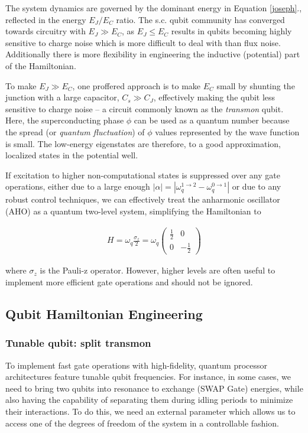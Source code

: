 \documentclass[svgnames]{article}     %
\begin{document}
The system dynamics are governed by the dominant energy in Equation
\ref{joseph}., reflected in the energy $E_J / E_C$ ratio. The s.c. qubit
community has converged towards circuitry with $E_J \gg E_C$, as  $E_J \leq
E_C$ results in qubits becoming highly sensitive to charge noise which is more
difficult to deal with than flux noise. Additionally there is more flexibility
in engineering the inductive (potential) part of the Hamiltonian.

To make $E_J \gg E_C$, one proffered approach is to make $E_C$ small by
shunting the junction with a large capacitor, $C_s \gg C_J$, effectively making
the qubit less sensitive to charge noise -- a circuit commonly known as the
\textit{transmon} qubit. Here, the superconducting phase $\phi$ can be used as
a quantum number because the spread (or \textit{quantum fluctuation}) of $\phi$
values represented by the wave function is small. The low-energy eigenstates
are therefore, to a good approximation, localized states in the potential well. 

If excitation to higher non-computational states is suppressed over any gate
operations, either due to a large enough $|\alpha| = |\omega_q^{1\rightarrow 2}
- \omega_q^{0\rightarrow 1}|$  or due to any robust control techniques, we can
effectively treat the anharmonic oscillator (AHO) as a quantum two-level
system, simplifying the Hamiltonian to 

\begin{align} \label{twoh}
  H = \omega_q \frac{\sigma_z}{2} = \omega_q \begin{pmatrix}
    \frac{1}{2} & 0 \\ 0 & -\frac{1}{2}
  \end{pmatrix} 
\end{align}\vspace{3px}

where $\sigma_z$ is the Pauli-z operator. However, higher levels are often
useful to implement more efficient gate operations and should not be ignored.

\subsection{Qubit Hamiltonian Engineering} 

\subsubsection{Tunable qubit: split transmon} 

To implement fast gate operations with high-fidelity, quantum processor
architectures feature tunable qubit frequencies. For instance, in some cases,
we need to bring two qubits into resonance to exchange (SWAP Gate) energies,
while also having the capability of separating them during idling periods to
minimize their interactions. To do this, we need an external parameter which
allows us to access one of the degrees of freedom of the system in
a controllable fashion.  
\end{document}
